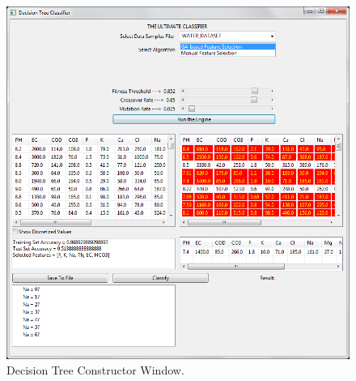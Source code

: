 \documentclass[12pt]{report}
\begin{document}
\begin{figure}[h!]
  
  \centering
    \includegraphics[scale=0.45]{dt_classifier.png}
\caption{Decision Tree Constructor Window.}
\end{figure}
\end{document}
